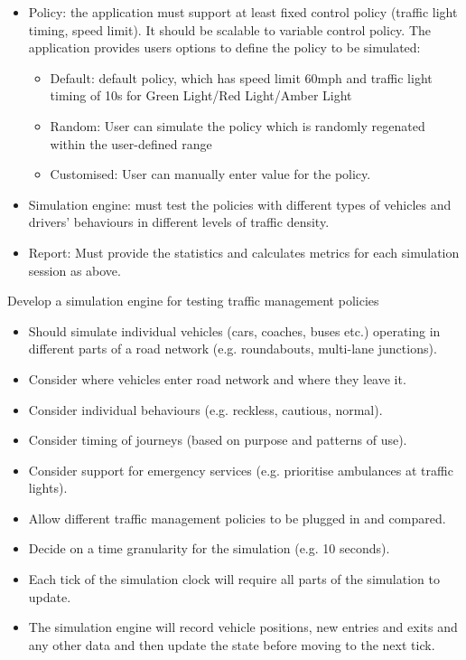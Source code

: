 \documentclass[11pt]{article}
\begin{document}
\begin{itemize}
\begin{itemize}
        \item Policy: the application must support at least fixed control policy (traffic light timing, speed limit). It should be scalable to variable control policy. The application provides users options to define the policy to be simulated:
            \begin{itemize}
                \item Default: default policy, which has speed limit 60mph and traffic light timing of 10s for Green Light/Red Light/Amber Light
                \item Random: User can simulate the policy which is randomly regenated within the user-defined range
                \item Customised: User can manually enter value for the policy.
    \end{itemize}

\item Simulation engine: must test the policies with different types of vehicles and drivers' behaviours in different levels of traffic density.
\item Report: Must provide the statistics and calculates metrics  for each simulation session as above.
\end{itemize}

        
    \end{itemize}
     Develop a simulation engine for testing traffic management
	policies
	\begin{itemize}[noitemsep]
	\item Should simulate individual vehicles (cars, coaches, buses etc.)
	operating in different parts of a road network (e.g. roundabouts,
	multi-lane junctions).
	\item Consider where vehicles enter road network and where they
	leave it.
	\item Consider individual behaviours (e.g. reckless, cautious, normal).
	\item Consider timing of journeys (based on purpose and patterns of
	use).
	\item Consider support for emergency services (e.g. prioritise
	ambulances at traffic lights).
	\item Allow different traffic management policies to be plugged in and
	compared.
	\item Decide on a time granularity for the simulation (e.g. 10 seconds).
	\item Each tick of the simulation clock will require all parts of the
	simulation to update.
	\item The simulation engine will record vehicle positions, new entries
	and exits and any other data and then update the state before
	moving to the next tick.
	\end{itemize}
	
\end{document}
